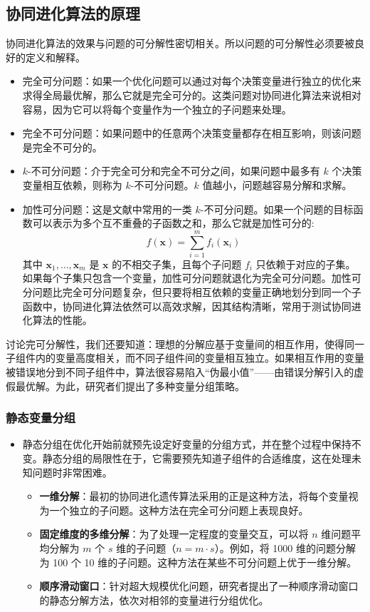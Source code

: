 \subsection{协同进化算法的原理}

协同进化算法的效果与问题的可分解性密切相关。所以问题的可分解性必须要被良好的定义和解释。

\begin{itemize}
\item 完全可分问题：如果一个优化问题可以通过对每个决策变量进行独立的优化来求得全局最优解，那么它就是完全可分的。这类问题对协同进化算法来说相对容易，因为它可以将每个变量作为一个独立的子问题来处理。
\item 完全不可分问题：如果问题中的任意两个决策变量都存在相互影响，则该问题是完全不可分的。
\item $k$-不可分问题：介于完全可分和完全不可分之间，如果问题中最多有 $k$ 个决策变量相互依赖，则称为 $k$-不可分问题。$k$ 值越小，问题越容易分解和求解。
\item 加性可分问题：这是文献中常用的一类 $k$-不可分问题。如果一个问题的目标函数可以表示为多个互不重叠的子函数之和，那么它就是加性可分的:\[f(\mathbf{x}) = \sum_{i=1}^{m} f_i(\mathbf{x}_i) \]其中 \(\mathbf{x}_1, \ldots, \mathbf{x}_m\) 是 \(\mathbf{x}\) 的不相交子集，且每个子问题 \(f_i\) 只依赖于对应的子集。如果每个子集只包含一个变量，加性可分问题就退化为完全可分问题。加性可分问题比完全可分问题复杂，但只要将相互依赖的变量正确地划分到同一个子函数中，协同进化算法依然可以高效求解，因其结构清晰，常用于测试协同进化算法的性能。
\end{itemize}

讨论完可分解性，我们还要知道：理想的分解应基于变量间的相互作用，使得同一子组件内的变量高度相关，而不同子组件间的变量相互独立。如果相互作用的变量被错误地分到不同子组件中，算法很容易陷入“伪最小值”——由错误分解引入的虚假最优解。为此，研究者们提出了多种变量分组策略。

\subsubsection{静态变量分组}
\begin{itemize}
    \item 静态分组在优化开始前就预先设定好变量的分组方式，并在整个过程中保持不变。静态分组的局限性在于，它需要预先知道子组件的合适维度，这在处理未知问题时非常困难。
    \begin{itemize}
        \item \textbf{一维分解}：最初的协同进化遗传算法采用的正是这种方法，将每个变量视为一个独立的子问题。这种方法在完全可分问题上表现良好。
        \item \textbf{固定维度的多维分解}：为了处理一定程度的变量交互，可以将 $n$ 维问题平均分解为 $m$ 个 $s$ 维的子问题（$n = m \cdot s$）。例如，将 1000 维的问题分解为 100 个 10 维的子问题。这种方法在某些不可分问题上优于一维分解。
        \item \textbf{顺序滑动窗口}：针对超大规模优化问题，研究者提出了一种顺序滑动窗口的静态分解方法，依次对相邻的变量进行分组优化。
    \end{itemize}
\end{itemize}

